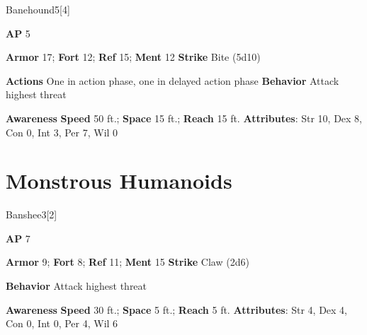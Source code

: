 \begin{monsection}{Banehound}{5}[4]
\vspace{-1em}\vspace{-1em}
\begin{spellcontent}
\begin{spelltargetinginfo}
{\textbf{AP} 5}

\pari \textbf{Armor} 17;
\textbf{Fort} 12;
\textbf{Ref} 15;
\textbf{Ment} 12
\pari \textbf{Strike} Bite  (5d10)


\pari \textbf{Actions} One in action phase, one in delayed action phase
\pari \textbf{Behavior} Attack highest threat
\end{spelltargetinginfo}
\end{spellcontent}

\begin{monsterfooter}
\pari \textbf{Awareness} 
\pari \textbf{Speed} 50 ft.;
\textbf{Space} 15 ft.;
\textbf{Reach} 15 ft.
\pari \textbf{Attributes}:
Str 10,
Dex 8,
Con 0,
Int 3,
Per 7,
Wil 0
\end{monsterfooter}
\end{monsection}

\section{Monstrous Humanoids}
\begin{monsection}{Banshee}{3}[2]
\vspace{-1em}\vspace{-1em}
\begin{spellcontent}
\begin{spelltargetinginfo}
{\textbf{AP} 7}

\pari \textbf{Armor} 9;
\textbf{Fort} 8;
\textbf{Ref} 11;
\textbf{Ment} 15
\pari \textbf{Strike} Claw  (2d6)



\pari \textbf{Behavior} Attack highest threat
\end{spelltargetinginfo}
\end{spellcontent}

\begin{monsterfooter}
\pari \textbf{Awareness} 
\pari \textbf{Speed} 30 ft.;
\textbf{Space} 5 ft.;
\textbf{Reach} 5 ft.
\pari \textbf{Attributes}:
Str 4,
Dex 4,
Con 0,
Int 0,
Per 4,
Wil 6
\end{monsterfooter}
\end{monsection}


